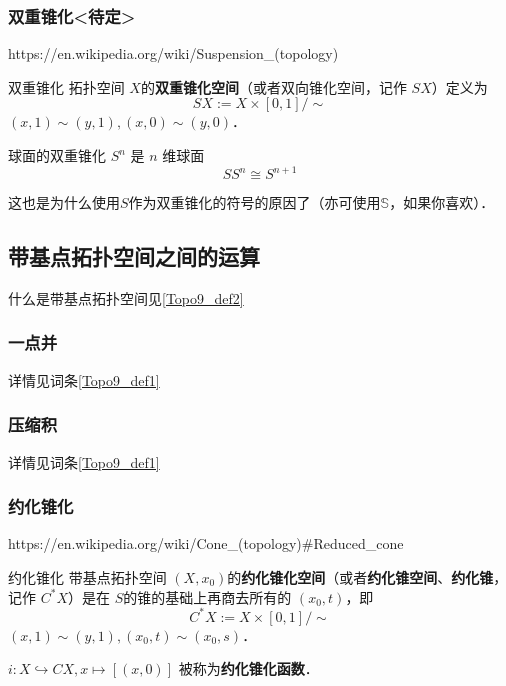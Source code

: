 
\subsubsection{双重锥化<待定>}

https://en.wikipedia.org/wiki/Suspension_(topology)

\begin{definition}{双重锥化}
拓扑空间 $X$的\textbf{双重锥化空间}（或者双向锥化空间，记作 $S X$）定义为
\[
    S X := X \times [0,1] / \sim
\]
$(x, 1) \sim (y, 1), (x, 0) \sim (y, 0)$．
\end{definition}

\begin{theorem}{球面的双重锥化}
$S^n$ 是 $n$ 维球面
\[
S S^n \cong S^{n+1}
\]
\end{theorem}
这也是为什么使用$S$作为双重锥化的符号的原因了（亦可使用$\mathbb{S}$，如果你喜欢）．


\subsection{带基点拓扑空间之间的运算}

什么是带基点拓扑空间见\autoref{Topo9_def2}~

\subsubsection{一点并}

详情见词条\autoref{Topo9_def1}~


\subsubsection{压缩积}

详情见词条\autoref{Topo9_def1}~


\subsubsection{约化锥化}

https://en.wikipedia.org/wiki/Cone_(topology)#Reduced_cone

\begin{definition}{约化锥化}
带基点拓扑空间 $(X, x_0)$的\textbf{约化锥化空间}（或者\textbf{约化锥空间}、\textbf{约化锥}，记作 $C^* X$）是在 $S$的锥的基础上再商去所有的 $(x_0, t)$，即
\[
    C^* X := X \times [0,1] / \sim
\]
$(x, 1) \sim (y, 1), (x_0, t) \sim (x_0, s)$．

$i: X \hookrightarrow C X, x \mapsto [(x, 0)]$ 被称为\textbf{约化锥化函数}．
\end{definition}
